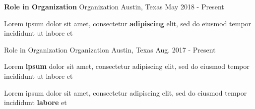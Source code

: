 

\begin{cventries}

  \cventry
    {\textbf{Role in Organization}} %
    {Organization} %
    {Austin, Texas} %
    {May 2018 - Present} %
    {
      \begin{cvitems} %
        \item {Lorem ipsum dolor sit amet, consectetur \textbf{adipiscing} elit, sed do eiusmod tempor incididunt ut labore et}
      \end{cvitems}
    }

  \cventry
    {Role in Organization} %
    {Organization} %
    {Austin, Texas} %
    {Aug. 2017 - Present} %
    {
      \begin{cvitems} %
        \item {Lorem \textbf{ipsum} dolor sit amet, consectetur adipiscing elit, sed do eiusmod tempor incididunt ut labore et}
        \item {Lorem ipsum dolor sit amet, consectetur adipiscing elit, sed do eiusmod tempor incididunt \textbf{labore} et}
      \end{cvitems}
    }

\end{cventries}
